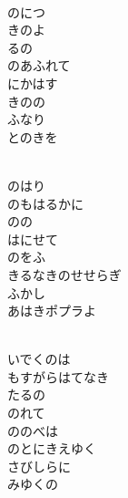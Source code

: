 \documentclass[10pt,b5j]{tarticle} %
\begin{document}
\vspace{1.5em} %
\newcommand{\linespace}{0.5em} %
\newcommand{\blocksize}{0.5\hsize} %
\newcommand{\itemmargin}{6em} %
\begin{enumerate} %
    \setlength{\itemindent}{\itemmargin} %
    \begin{minipage}[c]{\blocksize}
    
        \vspace{\linespace}
        \item~\\
        のにつ\\
        きのよ\\
        るの\\
        のあふれて\\
        にかはす\\
        きのの\\
        ふなり\\
        とのきを
        
        \vspace{\linespace}
        \item~\\
        のはり\\
        のもはるかに\\
        のの\\
        はにせて\\
        のをふ\\
        きるなきのせせらぎ\\
        ふかし\\
        あはきポプラよ
        
        \vspace{\linespace}
        \item~\\
        いでくのは\\
        もすがらはてなき\\
        たるの\\
        のれて\\
        ののべは\\
        のとにきえゆく\\
        さびしらに\\
        みゆくの
        

\end{minipage}
\end{enumerate}
\end{document}
